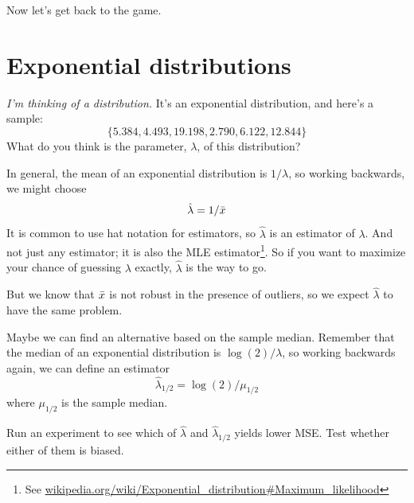 \documentclass[12pt]{book}
\begin{document}
Now let's get back to the game.


\section{Exponential distributions}

{\em I'm thinking of a distribution.}  It's an exponential distribution, and 
here's a sample:
%
\[ \{ 5.384, 4.493, 19.198, 2.790, 6.122, 12.844 \} \]
%
What do you think is the parameter, $\lambda$, of this distribution?


\newcommand{\lamhat}{\hat{\lambda}}
\newcommand{\lamhatmed}{\hat{\lambda}_{1/2}}

In general, the mean of an exponential distribution is $1 / \lambda$,
so working backwards, we might choose
%
\[ \lamhat = 1 / \xbar \]
%
It is common to use hat notation for estimators, so $\lamhat$ is an
estimator of $\lambda$.  And not just any estimator; it is also the
MLE estimator\footnote{See
\url{wikipedia.org/wiki/Exponential_distribution#Maximum_likelihood}}.
So if you want to maximize your chance of guessing $\lambda$ exactly,
$\lamhat$ is the way to go.


But we know that $\bar{x}$ is not robust in the presence of outliers, so
we expect $\lamhat$ to have the same problem.


Maybe we can find an alternative based on the sample median.  Remember
that the median of an exponential distribution is $\log(2) / \lambda$,
so working backwards again, we can define an estimator
%
\[ \lamhatmed = \log(2) / \mu_{1/2} \]
%
where $\mu_{1/2}$ is the sample median.


\begin{ex}

Run an experiment to see which of $\lamhat$ and $\lamhatmed$ yields
lower MSE.  Test whether either of them is biased.



\end{ex}
\end{document}
